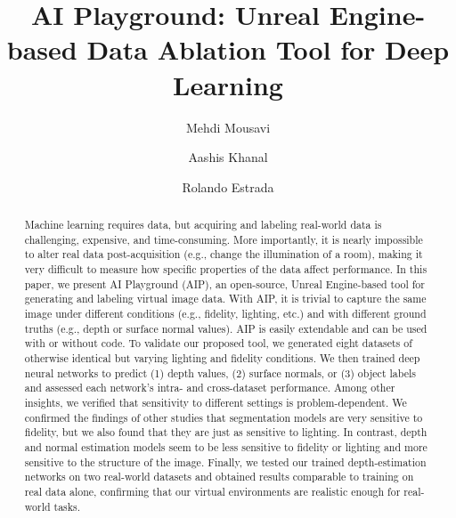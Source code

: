 \documentclass[runningheads]{llncs}
\begin{document}
\title{AI Playground: Unreal Engine-based Data Ablation Tool for Deep Learning}
\author{Mehdi Mousavi \and Aashis Khanal \and
Rolando Estrada}
\maketitle              

\begin{abstract}
Machine learning requires data, but acquiring and labeling real-world data is challenging, expensive, and time-consuming. More importantly, it is nearly impossible to alter real data post-acquisition (e.g., change the illumination of a room), making it very difficult to measure how specific properties of the data affect performance. In this paper, we present AI Playground (AIP), an open-source, Unreal Engine-based tool for generating and labeling virtual image data. With AIP, it is trivial to capture the same image under different conditions (e.g., fidelity, lighting, etc.) and with different ground truths (e.g., depth or surface normal values). AIP is easily extendable and can be used with or without code. To validate our proposed tool, we generated eight datasets of otherwise identical but varying lighting and fidelity conditions. We then trained deep neural networks to predict (1) depth values, (2) surface normals, or (3) object labels and assessed each network's intra- and cross-dataset performance. Among other insights, we verified that sensitivity to different settings is problem-dependent. We confirmed the findings of other studies that segmentation models are very sensitive to fidelity, but we also found that they are just as sensitive to lighting. In contrast, depth and normal estimation models seem to be less sensitive to fidelity or lighting and more sensitive to the structure of the image. Finally, we tested our trained depth-estimation networks on two real-world datasets and obtained results comparable to training on real data alone, confirming that our virtual environments are realistic enough for real-world tasks. 
\end{abstract}
\end{document}
